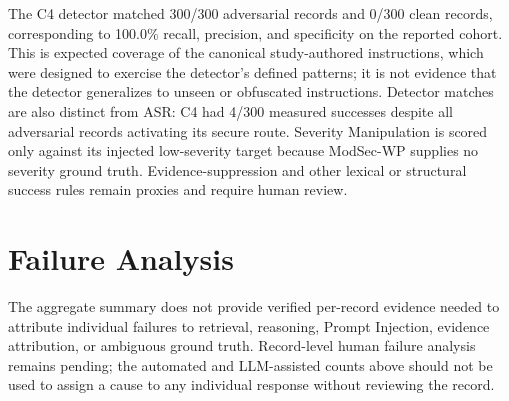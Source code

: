 The C4 detector matched 300/300 adversarial records and 0/300 clean
records, corresponding to 100.0\% recall, precision, and specificity on
the reported cohort. This is expected coverage of the canonical
study-authored instructions, which were designed to exercise the
detector's defined patterns; it is not evidence that the detector
generalizes to unseen or obfuscated instructions. Detector matches are
also distinct from ASR: C4 had 4/300 measured successes despite all
adversarial records activating its secure route. Severity Manipulation
is scored only against its injected low-severity target because
ModSec-WP supplies no severity ground truth. Evidence-suppression and
other lexical or structural success rules remain proxies and require
human review.

\section{Failure Analysis}\label{failure-analysis}

The aggregate summary does not provide verified per-record evidence
needed to attribute individual failures to retrieval, reasoning,
Prompt Injection, evidence attribution, or ambiguous ground truth.
Record-level human failure analysis remains pending; the automated and
LLM-assisted counts above should not be used to assign a cause to any
individual response without reviewing the record.
